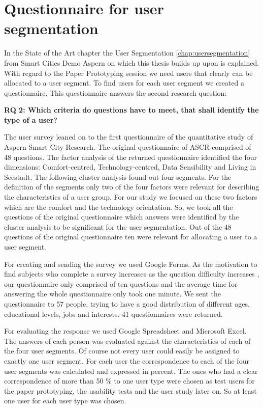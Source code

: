 \chapter{Questionnaire for user segmentation}

In the State of the Art chapter the User Segmentation \ref{chap:usersegmentation} from Smart Cities Demo Aspern on which this thesis builds up upon is explained. With regard to the Paper Prototyping session we need users that clearly can be allocated to a user segment. To find users for each user segment we created a questionnaire. This questionnaire answers the second research question:

\textbf{RQ 2: Which criteria do questions have to meet, that shall identify the type of a user?}


The user survey leaned on to the first questionnaire of the quantitative study of Aspern Smart City Research. The original questionnaire of ASCR comprised of 48 questions. The factor analysis of the returned questionnaire identified the four dimensions: Comfort-centred, Technology-centred, Data Sensibility and Living in Seestadt. The following cluster analysis found out four segments. For the definition of the segments only two of the four factors were relevant for describing the characteristics of a user group. For our study we focused on these two factors which are the comfort and the technology orientation. So, we took all the questions of the original questionnaire which answers were identified by the cluster analysis to be significant for the user segmentation. Out of the 48 questions of the original questionnaire ten were relevant for allocating a user to a user segment.

For creating and sending the survey we used Google Forms. As the motivation to find subjects who complete a survey increases as the question difficulty increases \cite{andrews2007conducting}, our questionnaire only comprised of ten questions and the average time for answering the whole questionnaire only took one minute. We sent the questionnaire to 57 people, trying to have a good distribution of different ages, educational levels, jobs and interests. 41 questionnaires were returned.

For evaluating the response we used Google Spreadsheet and Microsoft Excel. The answers of each person was evaluated against the characteristics of each of the four user segments. Of course not every user could easily be assigned to exactly one user segment. For each user the correspondence to each of the four user segments was calculated and expressed in percent. The ones who had a clear correspondence of more than 50 \% to one user type were chosen as test users for the paper prototyping, the usability tests and the user study later on. So at least one user for each user type was chosen. 

